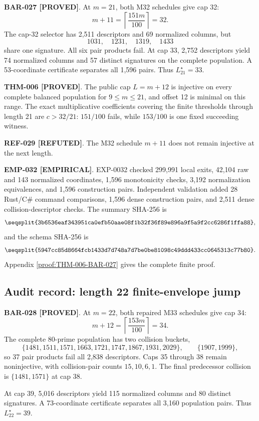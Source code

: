 \documentclass[11pt]{article}
\newcommand{\claimstatus}[2]{\textbf{#1 [#2]}}
\begin{document}
\claimstatus{BAR-027}{PROVED}. At \(m=21\), both M32 schedules give cap 32:
\[
m+11=\left\lceil\frac{151m}{100}\right\rceil=32.
\]
The cap-32 selector has 2,511 descriptors and 69 normalized columns, but
\[
1031,\quad1231,\quad1319,\quad1433
\]
share one signature. All six pair products fail. At cap 33, 2,752
descriptors yield 74 normalized columns and 57 distinct signatures on the
complete population. A 53-coordinate certificate separates all 1,596 pairs.
Thus \(L_{21}^\star=33\).

\claimstatus{THM-006}{PROVED}. The public cap \(L=m+12\) is injective on
every complete balanced population for \(9\le m\le21\), and offset 12 is
minimal on this range. The exact multiplicative coefficients covering the
finite thresholds through length 21 are \(c>32/21\): \(151/100\) fails,
while \(153/100\) is one fixed succeeding witness.

\claimstatus{REF-029}{REFUTED}. The M32 schedule \(m+11\) does not remain
injective at the next length.

\claimstatus{EMP-032}{EMPIRICAL}. EXP-0032 checked 299,991 local exits,
42,104 raw and 143 normalized coordinates, 1,596 monotonicity checks, 3,192
normalization equivalences, and 1,596 construction pairs. Independent
validation added 28 Rust/C\# command comparisons, 1,596 dense construction
pairs, and 2,511 dense collision-descriptor checks. The summary SHA-256 is
\[
\texttt{\seqsplit{3b6536eaf343951ca0efb50aae08f1b32f36f89e896a9f5a9f2cc6286f1ffa88}},
\]
and the schema SHA-256 is
\[
\texttt{\seqsplit{5947cc85d8664fcb1433d7d748a7d7be0be81098c49ddd433cc0645313c77b80}}.
\]
Appendix \ref{proof:THM-006-BAR-027} gives the complete finite proof.

\subsection{Audit record: length 22 finite-envelope jump}

\claimstatus{BAR-028}{PROVED}. At \(m=22\), both repaired M33 schedules give
cap 34:
\[
m+12=\left\lceil\frac{153m}{100}\right\rceil=34.
\]
The complete 80-prime population has two collision buckets,
\[
\{1481,1511,1571,1663,1721,1747,1867,1931,2029\},
\qquad
\{1907,1999\},
\]
so 37 pair products fail all 2,838 descriptors. Caps 35 through 38 remain
noninjective, with collision-pair counts \(15,10,6,1\). The final
predecessor collision is \(\{1481,1571\}\) at cap 38.

At cap 39, 5,016 descriptors yield 115 normalized columns and 80 distinct
signatures. A 73-coordinate certificate separates all 3,160 population
pairs. Thus \(L_{22}^\star=39\).
\end{document}
